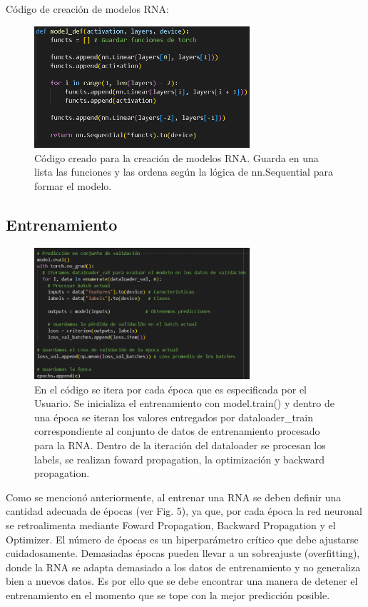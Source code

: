 \documentclass[journal]{IEEEtai}
\begin{document}
Código de creación de modelos RNA:

\begin{figure}[h!]
\centering
\includegraphics[width=8cm]{img/CODES/models.png}
\caption{Código creado para la creación de modelos RNA. Guarda en una lista las funciones y las ordena según la lógica de nn.Sequential para formar el modelo.}
\label{fig: RNAMODELSCODE}
\end{figure}

\subsection{Entrenamiento}

\begin{figure}[h!]
\centering
\includegraphics[width=8cm]{img/CODES/eval.png}
\caption{En el código se itera por cada época que es especificada por el Usuario. Se inicializa el entrenamiento con model.train() y dentro de una época se iteran los valores entregados por dataloader\_train correspondiente al conjunto de datos de entrenamiento procesado para la RNA. Dentro de la iteración del dataloader se procesan los labels, se realizan foward propagation, la optimización y backward propagation.}
\label{fig: RNATRAINMODEL}
\end{figure}

Como se mencionó anteriormente, al entrenar una RNA se deben definir una cantidad adecuada de épocas (ver Fig. 5), ya que, por cada época la red neuronal se retroalimenta mediante Foward Propagation, Backward Propagation y el Optimizer. El número de épocas es un hiperparámetro crítico que debe ajustarse cuidadosamente. Demasiadas épocas pueden llevar a un sobreajuste (overfitting), donde la RNA se adapta demasiado a los datos de entrenamiento y no generaliza bien a nuevos datos. Es por ello que se debe encontrar una manera de detener el entrenamiento en el momento que se tope con la mejor predicción posible.
\end{document}
